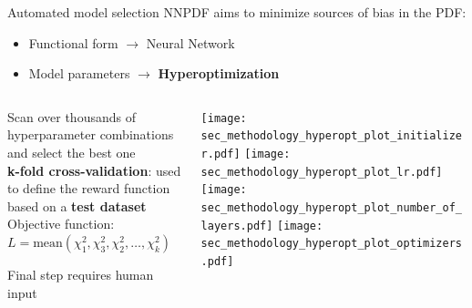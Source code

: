 \begin{frame}[t]{Automated model selection}
  NNPDF aims to minimize sources of bias in the PDF:
  \begin{itemize}
      \item Functional form $\rightarrow$ Neural Network
      \item Model parameters $\rightarrow$ \textbf{Hyperoptimization}
  \end{itemize}
    \begin{columns}
        \begin{column}{0.48\textwidth}
            Scan over thousands of hyperparameter combinations and select the best one \\
            \vspace*{0.8em}
            {\bf k-fold cross-validation}: used to define the reward function based on a {\bf test dataset}\\
            \vspace*{0.8em}
            Objective function: \\
            $L=\textrm{mean}(\chi_1^2,\chi_3^2,\chi_2^2,\ldots, \chi_k^2)$

            \vspace*{0.3cm}
            Final step requires human input
        \end{column}
        \begin{column}{0.48\textwidth}
            \begin{center}
                \texttt{[image: sec\_methodology\_hyperopt\_plot\_initializer.pdf]}
                \texttt{[image: sec\_methodology\_hyperopt\_plot\_lr.pdf]} \\
                \texttt{[image: sec\_methodology\_hyperopt\_plot\_number\_of\_layers.pdf]}
                \texttt{[image: sec\_methodology\_hyperopt\_plot\_optimizers.pdf]}
            \end{center}
        \end{column}
    \end{columns}
\end{frame}


